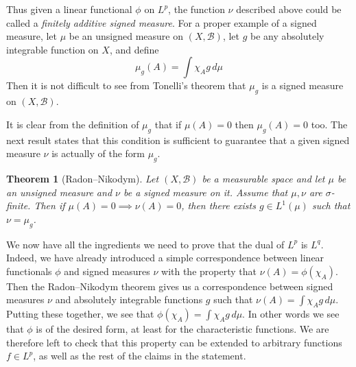 \documentclass[11pt,oneside]{amsbook}
\theoremstyle{definition}
\theoremstyle{plain}
\newtheorem{thm}{Theorem}[section]
\theoremstyle{definition}
\theoremstyle{remark}
\numberwithin{equation}{section}
\numberwithin{figure}{section}
\begin{document}
Thus given a linear functional $\phi$ on $L^p$, the function $\nu$ described above could be called a \emph{finitely additive signed measure}. For a proper example of a signed measure, let $\mu$ be an unsigned measure on $(X,\mathcal B)$, let $g$ be any absolutely integrable function on $X$, and define
\[\mu_g(A)=\int\chi_Ag\,d\mu
\]
Then it is not difficult to see from Tonelli's theorem that $\mu_g$ is a signed measure on $(X,\mathcal B)$.

It is clear from the definition of $\mu_g$ that if $\mu(A)=0$ then $\mu_g(A)=0$ too. The next result states that this condition is sufficient to guarantee that a given signed measure $\nu$ is actually of the form $\mu_g$.

\begin{thm}[Radon--Nikodym]
  Let $(X,\mathcal B)$ be a measurable space and let $\mu$ be an unsigned measure and $\nu$ be a signed measure on it. Assume that $\mu,\nu$ are $\sigma$-finite. Then if $\mu(A)=0\implies\nu(A)=0$, then there exists $g\in L^1(\mu)$ such that $\nu=\mu_g$.
\end{thm}

We now have all the ingredients we need to prove that the dual of $L^p$ is $L^q$. Indeed, we have already introduced a simple correspondence between linear functionals $\phi$ and signed measures $\nu$ with the property that $\nu(A)=\phi(\chi_A)$. Then the Radon--Nikodym theorem gives us a correspondence between signed measures $\nu$ and absolutely integrable functions $g$ such that $\nu(A)=\int\chi_Ag\,d\mu$. Putting these together, we see that $\phi(\chi_A)=\int\chi_Ag\,d\mu$. In other words we see that $\phi$ is of the desired form, at least for the characteristic functions. We are therefore left to check that this property can be extended to arbitrary functions $f\in L^p$, as well as the rest of the claims in the statement.
\end{document}
